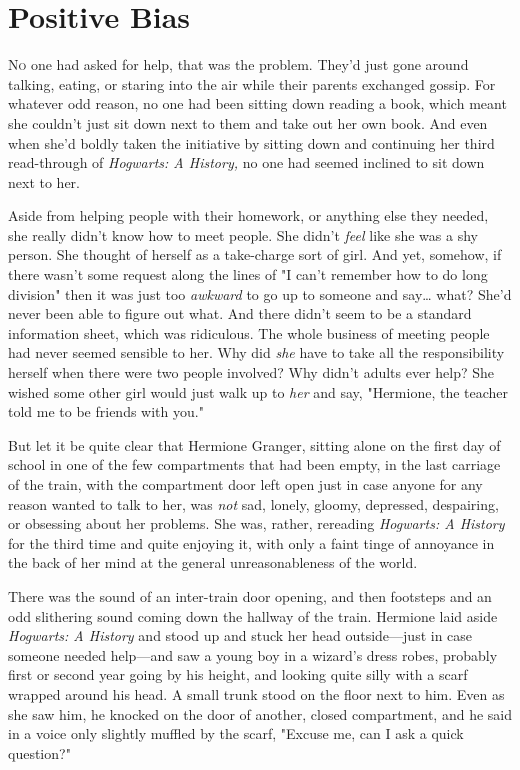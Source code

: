\chapter{Positive Bias}

\lettrine{N}{o} one had asked for help, that was the problem. They'd just gone around 
talking, eating, or staring into the air while their parents exchanged gossip. 
For whatever odd reason, no one had been sitting down reading a book, which 
meant she couldn't just sit down next to them and take out her own book. And 
even when she'd boldly taken the initiative by sitting down and continuing her 
third read-through of \emph{Hogwarts: A History,} no one had seemed inclined to 
sit down next to her.

Aside from helping people with their homework, or anything else they needed, 
she really didn't know how to meet people. She didn't \emph{feel} like she was 
a shy person. She thought of herself as a take-charge sort of girl. And yet, 
somehow, if there wasn't some request along the lines of "I can't remember how 
to do long division" then it was just too \emph{awkward} to go up to someone 
and say{\ldots} what? She'd never been able to figure out what. And there 
didn't seem to be a standard information sheet, which was ridiculous. The whole 
business of meeting people had never seemed sensible to her. Why did \emph{she} 
have to take all the responsibility herself when there were two people 
involved? Why didn't adults ever help? She wished some other girl would just 
walk up to \emph{her} and say, "Hermione, the teacher told me to be friends 
with you."

But let it be quite clear that Hermione Granger, sitting alone on the first day 
of school in one of the few compartments that had been empty, in the last 
carriage of the train, with the compartment door left open just in case anyone 
for any reason wanted to talk to her, was \emph{not} sad, lonely, gloomy, 
depressed, despairing, or obsessing about her problems. She was, rather, 
rereading \emph{Hogwarts: A History} for the third time and quite enjoying it, 
with only a faint tinge of annoyance in the back of her mind at the general 
unreasonableness of the world.

There was the sound of an inter-train door opening, and then footsteps and an 
odd slithering sound coming down the hallway of the train. Hermione laid aside 
\emph{Hogwarts: A History} and stood up and stuck her head outside---just in 
case someone needed help---and saw a young boy in a wizard's dress robes, 
probably first or second year going by his height, and looking quite silly with 
a scarf wrapped around his head. A small trunk stood on the floor next to him. 
Even as she saw him, he knocked on the door of another, closed compartment, and 
he said in a voice only slightly muffled by the scarf, "Excuse me, can I ask a 
quick question?"

